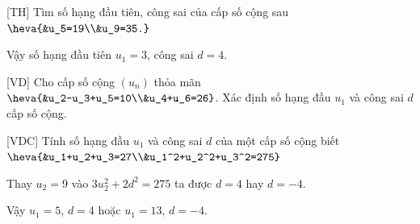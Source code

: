 \begin{bt}%
[TH]%
	Tìm số hạng đầu tiên, công sai của cấp số cộng sau $ \heva{&u_5=19\\&u_9=35.}$
	
	
	Vậy số hạng đầu tiên $ u_1=3 $, công sai $ d=4 $.
\end{bt}

\begin{bt}%
[VD]%
Cho cấp số cộng $ (u_n) $ thỏa mãn $ \heva{&u_2-u_3+u_5=10\\&u_4+u_6=26} $. Xác định số hạng đầu $ u_1 $ và công sai $ d $ cấp số cộng.         
\end{bt}

\begin{bt}%
[VDC]%
Tính số hạng đầu $ u_1 $ và công sai $d$ của một cấp số cộng biết $ \heva{&u_1+u_2+u_3=27\\&u_1^2+u_2^2+u_3^2=275} $


Thay $ u_2=9 $ vào $ 3u_2^2+2d^2=275 $ ta được $ d=4 $ hay $ d=-4 $.

Vậy $ u_1=5 $, $ d=4 $ hoặc $ u_1=13 $, $ d=-4 $.
\end{bt}


